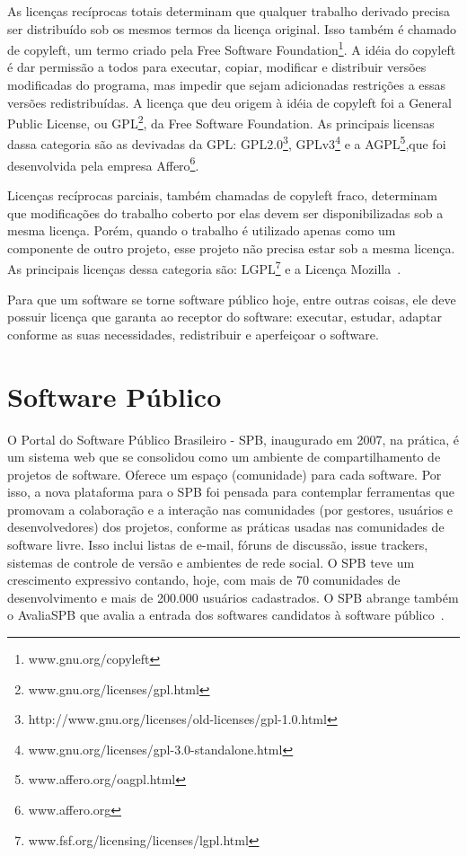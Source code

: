 As licenças recíprocas totais determinam que qualquer trabalho derivado precisa 
ser distribuído sob os mesmos termos da licença original. Isso também é chamado de copyleft,
um termo criado pela Free Software Foundation\footnote{www.gnu.org/copyleft}. A idéia do
copyleft é dar permissão a todos para executar, copiar, modificar e distribuir versões
modificadas do programa, mas impedir que sejam adicionadas restrições a essas versões
redistribuídas. A licença que deu origem à idéia de copyleft foi a General Public 
License, ou GPL\footnote{www.gnu.org/licenses/gpl.html}, da Free Software Foundation.
As principais licensas dassa categoria são as devivadas da GPL: 
GPL2.0\footnote{http://www.gnu.org/licenses/old-licenses/gpl-1.0.html}, 
GPLv3\footnote{www.gnu.org/licenses/gpl-3.0-standalone.html} e a
AGPL\footnote{www.affero.org/oagpl.html},que foi desenvolvida pela empresa 
Affero\footnote{www.affero.org}.~\cite{sabino2009licenccas}

Licenças recíprocas parciais, também chamadas de copyleft fraco, determinam que
modificações do trabalho coberto por elas devem ser disponibilizadas sob a mesma 
licença. Porém, quando o trabalho é utilizado apenas como um componente de outro 
projeto, esse projeto não precisa estar sob a mesma licença. As principais licenças
dessa categoria são: LGPL\footnote{www.fsf.org/licensing/licenses/lgpl.html} e a
Licença Mozilla~\cite{sabino2009licenccas}.

Para que um software se torne software público hoje, entre outras coisas, ele deve
possuir licença que garanta ao receptor do software: executar, estudar, 
adaptar conforme as suas necessidades, redistribuir e aperfeiçoar o software. 

\section{Software Público}

O Portal do Software Público Brasileiro - SPB, inaugurado em 2007, na prática, é um sistema
web que se consolidou como um ambiente de compartilhamento de projetos de software. Oferece um
espaço (comunidade) para cada software. Por isso, a nova plataforma para o SPB foi pensada
para contemplar ferramentas que promovam a colaboração e a interação nas comunidades 
(por gestores, usuários e desenvolvedores) dos projetos, conforme as práticas usadas nas
comunidades de software livre. Isso inclui listas de e-mail, fóruns de discussão, 
issue trackers, sistemas de controle de versão e ambientes de rede social.
O SPB teve um crescimento expressivo contando, hoje, com mais de 70 comunidades
de desenvolvimento e mais de 200.000 usuários cadastrados. O SPB abrange também o 
AvaliaSPB que avalia a entrada dos softwares candidatos à software público~\cite{softwarepublico}.

